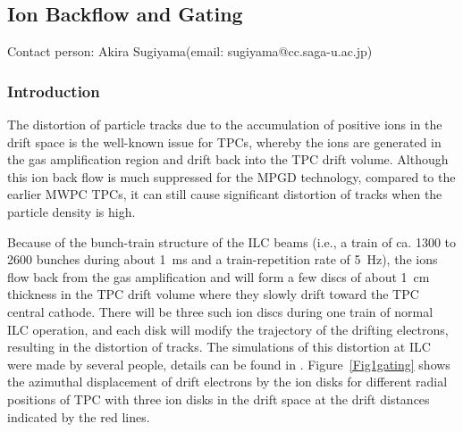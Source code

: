 \subsection{Ion Backflow and Gating}\label{chap:TPC_sec:gating}
Contact person: Akira Sugiyama(email: sugiyama@cc.saga-u.ac.jp)\\



\subsubsection{Introduction}

The distortion of particle tracks due to the accumulation of positive ions in the drift space is the well-known
issue for TPCs, whereby the ions are generated in the gas amplification region and drift back into the TPC drift volume.
Although this ion back flow is much suppressed for the MPGD technology, compared to the earlier MWPC TPCs, it can
still cause significant distortion of tracks when the particle density is high.

Because of the bunch-train structure of the ILC beams (i.e., a  train of ca. 1300 to 2600 bunches during
about \SI{1}{\milli\second}
and a train-repetition rate of \SI{5}{\hertz}), the ions flow back from the gas amplification and will form a few discs
of about \SI{1}{\centi\meter} thickness in the TPC drift volume where they slowly drift toward the TPC central cathode.
There will be three such ion discs during one train of normal ILC operation, and each disk will modify the trajectory
of the drifting electrons, resulting in the distortion of tracks. The simulations of this distortion at ILC
were made by several people, details can be found in \cite{LCTPCJap-IonGate,Fujii_IonEffects}.
Figure~\ref{Fig1gating} shows the azimuthal displacement of drift electrons by the ion
disks for different radial positions of TPC with three ion disks in the drift space at the drift distances
indicated by the red lines.




